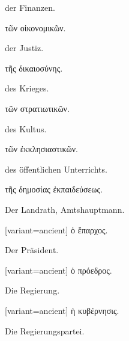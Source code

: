 \switchcolumn*

\qquad{}der Finanzen.

\switchcolumn

\qquad{}\textgreek[variant=ancient]{τῶν οἰκονομικῶν.}

\switchcolumn*

\qquad{}der Justiz.

\switchcolumn

\qquad{}\textgreek[variant=ancient]{τῆς δικαιοσύνης.}

\switchcolumn*

\qquad{}des Krieges.

\switchcolumn

\qquad{}\textgreek[variant=ancient]{τῶν στρατιωτικῶν.}

\switchcolumn*

\qquad{}des Kultus.

\switchcolumn

\qquad{}\textgreek[variant=ancient]{τῶν ἐκκλησιαστικῶν.}

\switchcolumn*

\qquad{}des öffentlichen Unterrichts.

\switchcolumn

\qquad{}\textgreek[variant=ancient]{τῆς δημοσίας ἐκπαιδεύσεως.}

\switchcolumn*

Der Landrath, Amts\textcompwordmark{}hauptmann.

\switchcolumn

\begin{greek}[variant=ancient]%
ὁ ἔπαρχος.

\end{greek}%
\switchcolumn*

Der Präsident.

\switchcolumn

\begin{greek}[variant=ancient]%
ὁ πρόεδρος.

\end{greek}%
\switchcolumn*

Die Regierung.

\switchcolumn

\begin{greek}[variant=ancient]%
ἡ κυβέρνησις.

\end{greek}%
\switchcolumn*

Die Regierungs\textcompwordmark{}partei.

\switchcolumn

